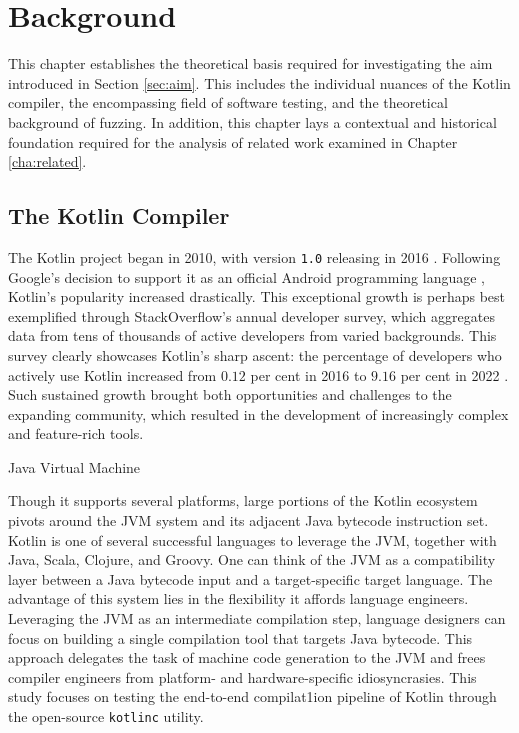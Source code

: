 \chapter{\label{cha:background}Background} 

This chapter establishes the theoretical basis
required for investigating the aim introduced in
Section \ref{sec:aim}.
This includes the individual nuances of the Kotlin compiler,
the encompassing field of software testing, and the theoretical
background of fuzzing.
In addition, this chapter lays a contextual and historical foundation
required for the analysis of related work examined in Chapter \ref{cha:related}.

\section{The Kotlin Compiler}

The Kotlin project began in 2010, with version \texttt{1.0} releasing
in 2016 \citep{stepanov2021type}.
Following Google's decision to support it as an official Android
programming language \cite{kotlin5years}, Kotlin's popularity increased drastically.
This exceptional growth is perhaps best exemplified through
StackOverflow's annual developer survey, which aggregates data from
tens of thousands of active developers from varied backgrounds.
This survey clearly showcases Kotlin's sharp ascent: the percentage of
developers who actively use Kotlin increased from $0.12$ per cent in 2016
to $9.16$ per cent in 2022 \citep{sosurvey2016, sosurvey2022}. 
Such sustained growth brought both opportunities and challenges to the
expanding community, which resulted in the development of increasingly
complex and feature-rich tools.

 {Java Virtual Machine}

Though it supports several platforms, large portions of the Kotlin ecosystem pivots around
the \Gls{JVM} system and its adjacent Java bytecode instruction set.
Kotlin is one of several successful languages to leverage the \gls{JVM},
together with Java, Scala, Clojure, and Groovy. 
One can think of the \gls{JVM} as a compatibility layer
between a Java bytecode input and a target-specific target language.
The advantage of this system lies in the flexibility it affords
language engineers.
Leveraging the \gls{JVM} as an intermediate compilation step,
language designers can focus on building a single compilation tool
that targets Java bytecode.
This approach delegates the task of machine code
generation to the \gls{JVM} and frees compiler engineers from
platform- and hardware-specific idiosyncrasies.
This study focuses on testing the end-to-end compilat1ion pipeline
of Kotlin through the open-source \texttt{kotlinc} utility.

